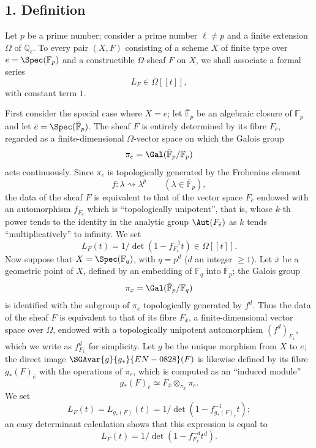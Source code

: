 \subsection*{1. Definition}

Let $p$ be a prime number; consider a prime number $\ell\ne p$ and a finite extension $\Omega$ of $\mathbb Q_\ell$. To every pair $(X,F)$ consisting of a scheme $X$ of finite type over $e=\Spec(\mathbb F_p)$ and a constructible $\Omega$-sheaf $F$ on $X$, we shall associate a formal series
\[
L_F\in\Omega[[t]],
\]
with constant term $1$.


First consider the special case where %
$X=e$; let $\bar{\mathbb F}_p$ be an algebraic closure of $\mathbb F_p$ and let $\bar e=\Spec(\bar{\mathbb F}_p)$. The sheaf $F$ is entirely determined by its fibre $F_{\bar e}$, regarded as a finite-dimensional $\Omega$-vector space on which the Galois group
\[
\pi_e=\Gal(\bar{\mathbb F}_p/\mathbb F_p)
\]
acts continuously. Since $\pi_e$ is topologically generated by the Frobenius element
\[
f:\lambda\rightsquigarrow\lambda^p\qquad(\lambda\in\bar{\mathbb F}_p),
\]
the data of the sheaf $F$ is equivalent to that of the vector space $F_{\bar e}$ endowed with an automorphism $f_{F_{\bar e}}$ which is ``topologically unipotent'', that is, whose $k$-th power tends to the identity in the analytic group $\Aut(F_{\bar e})$ as $k$ tends ``multiplicatively'' to infinity. We set
\[
L_F(t)=1/\det(1-f_{F_{\bar e}}^{-1}t)\in\Omega[[t]].
\]
Now suppose that $X=\Spec(\mathbb F_q)$, with $q=p^d$ ($d$ an integer $\ge1$). Let $\bar x$ be a geometric point of $X$, defined by an embedding of $\mathbb F_q$ into $\bar{\mathbb F}_p$; the Galois group
\[
\pi_x=\Gal(\bar{\mathbb F}_p/\mathbb F_q)
\]
is identified with the subgroup of $\pi_e$ topologically generated by $f^d$. Thus the data of the sheaf $F$ is equivalent to that of its fibre $F_{\bar x}$, a finite-dimensional vector space over $\Omega$, endowed with a topologically unipotent automorphism $(f^d)_{F_{\bar x}}$, which we write as $f^d_{F_{\bar x}}$ for simplicity. Let $g$ be the unique morphism from $X$ to $e$; the direct image $\SGAvar{g}{g_*}{EN-0828}(F)$ is likewise defined by its fibre $g_*(F)_{\bar e}$ with the operations of $\pi_e$, which is computed as an ``induced module''
\[
g_*(F)_{\bar e}\simeq F_{\bar x}\otimes_{\pi_x}\pi_e.
\]
We set
\[
L_F(t)=L_{g_*(F)}(t)=1/\det(1-f^{-1}_{g_*(F)_{\bar e}}t);
\]
an easy determinant calculation shows that this expression is equal to
\[
L_F(t)=1/\det(1-f^{-d}_{F_{\bar x}}t^d).
\]

